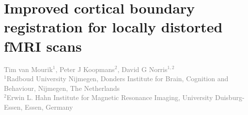 
\chapter{Improved cortical boundary registration for locally distorted fMRI scans}
\label{ch:registration}

\textcolor{gray}{{Tim van Mourik$^{1}$}, Peter J Koopmans$^{2}$, David G Norris$^{1,2}$\\
$^{1}$Radboud University Nijmegen, Donders Institute for Brain, Cognition and Behaviour, Nijmegen, The Netherlands \\
$^{2}$Erwin L. Hahn Institute for Magnetic Resonance Imaging, University Duisburg-Essen, Essen, Germany}\\

\linespread{1.5}
\newpage







